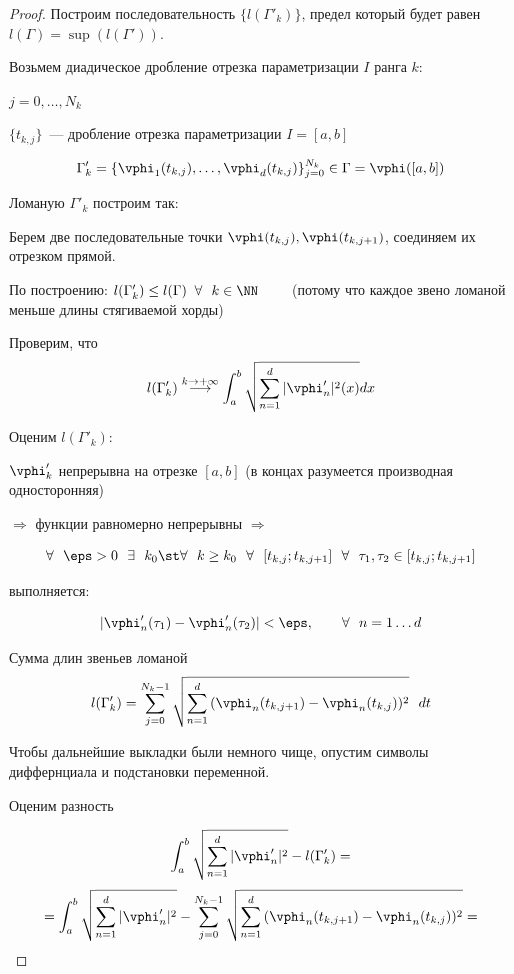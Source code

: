 \begin{proof}

    Построим последовательность $\{l(\Gamma'_k)\}$, предел который будет равен $l(\Gamma) = \sup(l(\Gamma'))$.

    Возьмем диадическое дробление отрезка параметризации $I$ ранга $k$:

    $j = 0, \ldots, N_k$

    $\{t_{k, j}\}$~--- дробление отрезка параметризации $I = [a, b]$

    \[
    \Gamma'_k = \{\vphi_1(t_{k, j}), \ldots, \vphi_d(t_{k, j}) \}_{j=0}^{N_k} \in \Gamma = \vphi([a, b])
    \]

    Ломаную $\Gamma'_k$ построим так: 

    Берем две последовательные точки $\vphi(t_{k, j}), \vphi(t_{k, j+1})$, соединяем их отрезком прямой.

    По построению: $l(\Gamma'_k) \le l(\Gamma) \; \; \forall \ \ k \in \NN \qquad$ (потому что каждое звено ломаной меньше длины стягиваемой хорды)
    

    Проверим, что 
    \[
    l(\Gamma'_k) \overset{k \rightarrow +\infty}{\longrightarrow} \int_{a}^{b} \sqrt{\sum_{n=1}^d{|\vphi'_n|^2(x)}} dx
    \]

    Оценим $l(\Gamma'_k)$:

    $\vphi_k'$ непрерывна на отрезке $[a, b]$ (в концах разумеется производная односторонняя)

    $\Rightarrow$ функции равномерно непрерывны $\Rightarrow$
    
    \[ \forall \ \ \eps > 0 \ \ \exists \ \ k_0 \st \forall \ \ k \ge k_0 \ \
     \forall \ \ [t_{k, j}; t_{k, j+1}] \ \ \forall \ \ \tau_1, \tau_2 \in [t_{k, j}; t_{k, j+1}] \]

    выполняется:

    \[
    |\vphi_n'(\tau_1) - \vphi_n'(\tau_2)| < \eps, \qquad \forall \ \ n = 1 \ldots d
    \]

    Сумма длин звеньев ломаной
    \[ l(\Gamma'_k) = \sum_{j=0}^{N_k-1}{\sqrt{\sum_{n=1}^d{(\vphi_n(t_{k, j+1}) - \vphi_n(t_{k, j}))^2}} \ \ dt } \]

    Чтобы дальнейшие выкладки были немного чище, опустим символы диффернциала и подстановки переменной.

    Оценим разность 

    \[
    \int_a^b{\sqrt{\sum_{n=1}^d{|\vphi_n'|^2}}} - l(\Gamma_k') =
    \]
    \[
    = \int_a^b{\sqrt{\sum_{n=1}^d{|\vphi_n'|^2}}} - 
    \sum_{j=0}^{N_k-1}\sqrt{\sum_{n=1}^d{(\vphi_n(t_{k, j+1}) - \vphi_n(t_{k, j}))^2}} = 
    \]


\end{proof}
